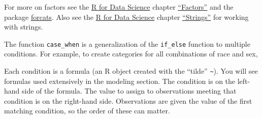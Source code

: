\documentclass[]{book}
\newenvironment{Shaded}{\begin{snugshade}}{\end{snugshade}}
\newcommand{\CommentTok}[1]{\textcolor[rgb]{0.56,0.35,0.01}{\textit{#1}}}
\newcommand{\DataTypeTok}[1]{\textcolor[rgb]{0.13,0.29,0.53}{#1}}
\newcommand{\KeywordTok}[1]{\textcolor[rgb]{0.13,0.29,0.53}{\textbf{#1}}}
\newcommand{\NormalTok}[1]{#1}
\newcommand{\OperatorTok}[1]{\textcolor[rgb]{0.81,0.36,0.00}{\textbf{#1}}}
\newcommand{\StringTok}[1]{\textcolor[rgb]{0.31,0.60,0.02}{#1}}
\theoremstyle{definition}
\theoremstyle{definition}
\theoremstyle{definition}
\theoremstyle{remark}
\begin{document}
For more on factors see the \href{http://r4ds.had.co.nz/}{R for Data
Science} chapter \href{http://r4ds.had.co.nz/factors.html}{``Factors''}
and the package
\href{https://cran.r-project.org/package=forcats}{forcats}. Also see the
\href{http://r4ds.had.co.nz/}{R for Data Science} chapter
\href{http://r4ds.had.co.nz/strings.html}{``Strings''} for working with
strings.

The function \texttt{case\_when} is a generalization of the
\texttt{if\_else} function to multiple conditions. For example, to
create categories for all combinations of race and sex,

\begin{Shaded}
\end{Shaded}

Each condition is a formula (an R object created with the ``tilde''
\texttt{\textasciitilde{}}). You will see formulas used extensively in
the modeling section. The condition is on the left-hand side of the
formula. The value to assign to observations meeting that condition is
on the right-hand side. Observations are given the value of the first
matching condition, so the order of these can matter.
\end{document}
